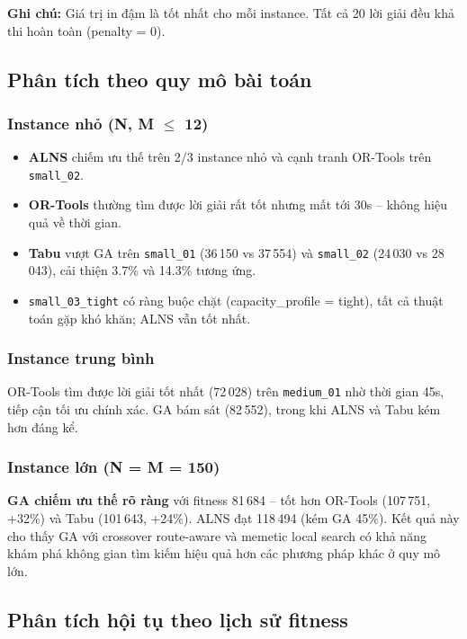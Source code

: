 \documentclass[12pt, a4paper]{article}
\begin{document}
\textbf{Ghi chú:} Giá trị in đậm là tốt nhất cho mỗi instance. Tất cả 20 lời giải đều khả thi hoàn toàn (penalty = 0).

\subsection{Phân tích theo quy mô bài toán}

\subsubsection{Instance nhỏ (N, M $\leq$ 12)}

\begin{itemize}
  \item \textbf{ALNS} chiếm ưu thế trên 2/3 instance nhỏ và cạnh tranh OR-Tools trên \texttt{small\_02}.
  \item \textbf{OR-Tools} thường tìm được lời giải rất tốt nhưng mất tới 30s -- không hiệu quả về thời gian.
  \item \textbf{Tabu} vượt GA trên \texttt{small\_01} (36\,150 vs 37\,554) và \texttt{small\_02} (24\,030 vs 28\,043), cải thiện 3.7\% và 14.3\% tương ứng.
  \item \texttt{small\_03\_tight} có ràng buộc chặt (capacity\_profile = tight), tất cả thuật toán gặp khó khăn; ALNS vẫn tốt nhất.
\end{itemize}

\subsubsection{Instance trung bình}

OR-Tools tìm được lời giải tốt nhất (72\,028) trên \texttt{medium\_01} nhờ thời gian 45s, tiếp cận tối ưu chính xác. GA bám sát (82\,552), trong khi ALNS và Tabu kém hơn đáng kể.

\subsubsection{Instance lớn (N = M = 150)}

\textbf{GA chiếm ưu thế rõ ràng} với fitness 81\,684 -- tốt hơn OR-Tools (107\,751, +32\%) và Tabu (101\,643, +24\%). ALNS đạt 118\,494 (kém GA 45\%). Kết quả này cho thấy GA với crossover route-aware và memetic local search có khả năng khám phá không gian tìm kiếm hiệu quả hơn các phương pháp khác ở quy mô lớn.

\subsection{Phân tích hội tụ theo lịch sử fitness}
\end{document}
